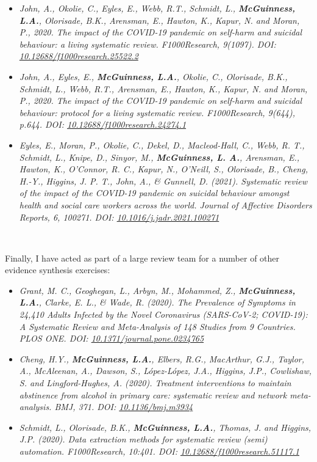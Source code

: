 \documentclass[a4paper, twoside]{templates/ociamthesis}
\begin{document}
\begin{itemize}
\item
  \emph{John, A., Okolie, C., Eyles, E., Webb, R.T., Schmidt, L., \textbf{McGuinness, L.A.}, Olorisade, B.K., Arensman, E., Hawton, K., Kapur, N. and Moran, P., 2020. The impact of the COVID-19 pandemic on self-harm and suicidal behaviour: a living systematic review. F1000Research, 9(1097). DOI: ~ \href{https://doi.org/10.12688/f1000research.25522.2}{10.12688/f1000research.25522.2}}
\item
  \emph{John, A., Eyles, E., \textbf{McGuinness, L.A.}, Okolie, C., Olorisade, B.K., Schmidt, L., Webb, R.T., Arensman, E., Hawton, K., Kapur, N. and Moran, P., 2020. The impact of the COVID-19 pandemic on self-harm and suicidal behaviour: protocol for a living systematic review. F1000Research, 9(644), p.644. DOI: \href{https://doi.org/10.12688/f1000research.24274.1}{10.12688/f1000research.24274.1}}
\item
  \emph{Eyles, E., Moran, P., Okolie, C., Dekel, D., Macleod-Hall, C., Webb, R. T., Schmidt, L., Knipe, D., Sinyor, M., \textbf{McGuinness, L. A.}, Arensman, E., Hawton, K., O'Connor, R. C., Kapur, N., O'Neill, S., Olorisade, B., Cheng, H.-Y., Higgins, J. P. T., John, A., \& Gunnell, D. (2021). Systematic review of the impact of the COVID-19 pandemic on suicidal behaviour amongst health and social care workers across the world. Journal of Affective Disorders Reports, 6, 100271. DOI: \href{https://doi.org/10.1016/j.jadr.2021.100271}{10.1016/j.jadr.2021.100271}}
\end{itemize}

~

Finally, I have acted as part of a large review team for a number of other evidence synthesis exercises:

\begin{itemize}
\item
  \emph{Grant, M. C., Geoghegan, L., Arbyn, M., Mohammed, Z., \textbf{McGuinness, L.A.}, Clarke, E. L., \& Wade, R. (2020). The Prevalence of Symptoms in 24,410 Adults Infected by the Novel Coronavirus (SARS-CoV-2; COVID-19): A Systematic Review and Meta-Analysis of 148 Studies from 9 Countries. PLOS ONE. DOI: \href{https://doi.org/10.1371/journal.pone.0234765}{10.1371/journal.pone.0234765}}
\item
  \emph{Cheng, H.Y., \textbf{McGuinness, L.A.}, Elbers, R.G., MacArthur, G.J., Taylor, A., McAleenan, A., Dawson, S., López-López, J.A., Higgins, J.P., Cowlishaw, S. and Lingford-Hughes, A. (2020). Treatment interventions to maintain abstinence from alcohol in primary care: systematic review and network meta-analysis. BMJ, 371. DOI: \href{https://doi.org/10.1136/bmj.m3934}{10.1136/bmj.m3934}}
\item
  \emph{Schmidt, L., Olorisade, B.K., \textbf{McGuinness, L.A.}, Thomas, J. and Higgins, J.P. (2020). Data extraction methods for systematic review (semi) automation. F1000Research, 10:401. DOI: \href{https://doi.org/10.12688/f1000research.51117.1}{10.12688/f1000research.51117.1}}
\end{itemize}
\end{document}
